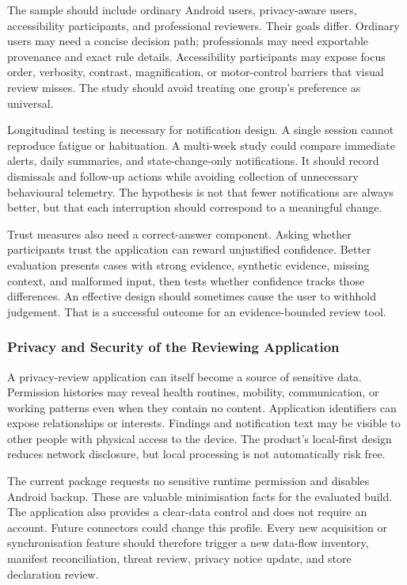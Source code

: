 The sample should include ordinary Android users, privacy-aware users, accessibility participants, and professional reviewers. Their goals differ. Ordinary users may need a concise decision path; professionals may need exportable provenance and exact rule details. Accessibility participants may expose focus order, verbosity, contrast, magnification, or motor-control barriers that visual review misses. The study should avoid treating one group's preference as universal.

Longitudinal testing is necessary for notification design. A single session cannot reproduce fatigue or habituation. A multi-week study could compare immediate alerts, daily summaries, and state-change-only notifications. It should record dismissals and follow-up actions while avoiding collection of unnecessary behavioural telemetry. The hypothesis is not that fewer notifications are always better, but that each interruption should correspond to a meaningful change.

Trust measures also need a correct-answer component. Asking whether participants trust the application can reward unjustified confidence. Better evaluation presents cases with strong evidence, synthetic evidence, missing context, and malformed input, then tests whether confidence tracks those differences. An effective design should sometimes cause the user to withhold judgement. That is a successful outcome for an evidence-bounded review tool.

\subsubsection{Privacy and Security of the Reviewing Application}

A privacy-review application can itself become a source of sensitive data. Permission histories may reveal health routines, mobility, communication, or working patterns even when they contain no content. Application identifiers can expose relationships or interests. Findings and notification text may be visible to other people with physical access to the device. The product's local-first design reduces network disclosure, but local processing is not automatically risk free.

The current package requests no sensitive runtime permission and disables Android backup. These are valuable minimisation facts for the evaluated build. The application also provides a clear-data control and does not require an account. Future connectors could change this profile. Every new acquisition or synchronisation feature should therefore trigger a new data-flow inventory, manifest reconciliation, threat review, privacy notice update, and store declaration review.


